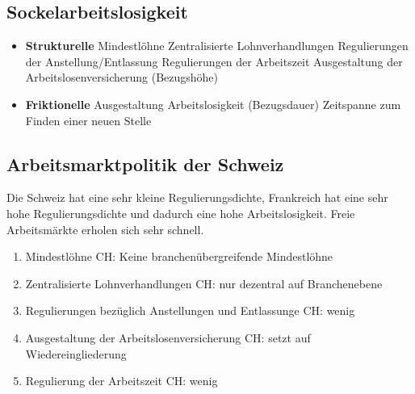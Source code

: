 	\subsection{Sockelarbeitslosigkeit}
	\begin{itemize}
		\item \textbf{Strukturelle}
		\subitem Mindestlöhne
		\subitem Zentralisierte Lohnverhandlungen
		\subitem Regulierungen der Anstellung/Entlassung
		\subitem Regulierungen der Arbeitszeit
		\subitem Ausgestaltung der Arbeitslosenversicherung (Bezugshöhe)
		\item \textbf{Friktionelle}
		\subitem Ausgestaltung Arbeitslosigkeit (Bezugsdauer)
		\subitem Zeitspanne zum Finden einer neuen Stelle
	\end{itemize}
	\subsection{Arbeitsmarktpolitik der Schweiz}
	Die Schweiz hat eine sehr kleine Regulierungsdichte, Frankreich hat eine sehr hohe Regulierungsdichte und dadurch eine hohe Arbeitslosigkeit. Freie Arbeitsmärkte erholen sich sehr schnell. 
	\begin{enumerate}
		\item Mindestlöhne
		\subitem CH: Keine branchenübergreifende Mindestlöhne
		\item Zentralisierte Lohnverhandlungen
		\subitem CH: nur dezentral auf Branchenebene
		\item Regulierungen bezüglich Anstellungen und Entlassunge
		\subitem CH: wenig
		\item Ausgestaltung der Arbeitslosenversicherung
		\subitem CH: setzt auf Wiedereingliederung
		\item Regulierung der Arbeitszeit
		\subitem CH: wenig
	\end{enumerate}
\clearpage
\pagebreak


